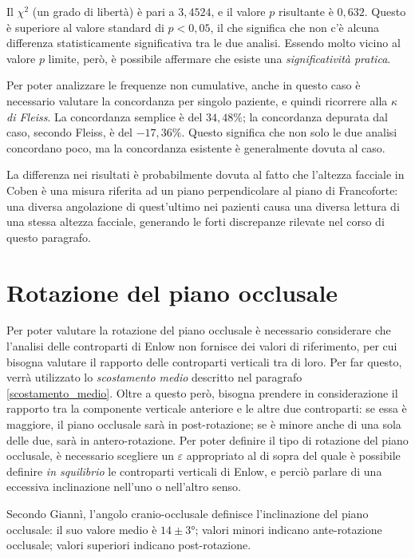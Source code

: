 Il $\chi^2$ (un grado di libertà) è pari a $3,4524$, e il valore $p$ risultante è $0,632$. Questo è superiore al valore standard di $p < 0,05$, il che significa che non c'è alcuna differenza statisticamente significativa tra le due analisi. Essendo molto vicino al valore $p$ limite, però, è possibile affermare che esiste una \emph{significatività pratica}.

Per poter analizzare le frequenze non cumulative, anche in questo caso è necessario valutare la concordanza per singolo paziente, e quindi ricorrere alla \emph{$\kappa$ di Fleiss}. La concordanza semplice è del $34,48\%$; la concordanza depurata dal caso, secondo Fleiss, è del $-17,36\%$. Questo significa che non solo le due analisi concordano poco, ma la concordanza esistente è generalmente dovuta al caso.

La differenza nei risultati è probabilmente dovuta al fatto che l'altezza facciale in Coben è una misura riferita ad un piano perpendicolare al piano di Francoforte: una diversa angolazione di quest'ultimo nei pazienti causa una diversa lettura di una stessa altezza facciale, generando le forti discrepanze rilevate nel corso di questo paragrafo.

\section{Rotazione del piano occlusale}
Per poter valutare la rotazione del piano occlusale è necessario considerare che l'analisi delle controparti di Enlow non fornisce dei valori di riferimento, per cui bisogna valutare il rapporto delle controparti verticali tra di loro. Per far questo, verrà utilizzato lo \emph{scostamento medio} descritto nel paragrafo \vref{scostamento_medio}. Oltre a questo però, bisogna prendere in considerazione il rapporto tra la componente verticale anteriore e le altre due controparti: se essa è maggiore, il piano occlusale sarà in post-rotazione; se è minore anche di una sola delle due, sarà in antero-rotazione. Per poter definire il tipo di rotazione del piano occlusale, è necessario scegliere un $\varepsilon$ appropriato al di sopra del quale è possibile definire \emph{in squilibrio} le controparti verticali di Enlow, e perciò parlare di una eccessiva inclinazione nell'uno o nell'altro senso.

Secondo Giannì, l'angolo cranio-occlusale definisce l'inclinazione del piano occlusale: il suo valore medio è $14 \pm 3°$; valori minori indicano ante-rotazione occlusale; valori superiori indicano post-rotazione.

